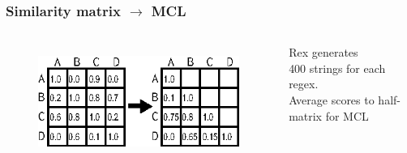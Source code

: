 \begin{frame}
\frametitle{Similarity matrix $\rightarrow$ MCL}

\begin{columns}[t] %
\begin{figure}[h]
  \centering
  \includegraphics[scale=1]{nontex/illustrations/matrixToGraph.eps}
  \label{fig:matrixToGraph}
\end{figure}
\begin{center}
Rex  generates \\
400 strings for each regex.\\
Average scores to half-matrix for MCL\\
\end{center}
\end{columns}
\end{frame}










